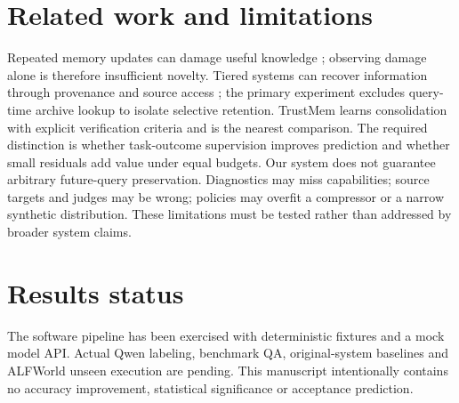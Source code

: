 \documentclass[11pt]{article}
\begin{document}
\section{Related work and limitations}
Repeated memory updates can damage useful knowledge \cite{faulty}; observing
damage alone is therefore insufficient novelty. Tiered systems can recover
information through provenance and source access \cite{tiermem}; the primary
experiment excludes query-time archive lookup to isolate selective retention.
TrustMem learns consolidation with explicit verification criteria \cite{trustmem}
and is the nearest comparison. The required distinction is whether task-outcome
supervision improves prediction and whether small residuals add value under equal
budgets. Our system does not guarantee arbitrary future-query preservation.
Diagnostics may miss capabilities; source targets and judges may be wrong;
policies may overfit a compressor or a narrow synthetic distribution. These
limitations must be tested rather than addressed by broader system claims.

\section{Results status}
The software pipeline has been exercised with deterministic fixtures and a mock
model API. Actual Qwen labeling, benchmark QA, original-system baselines and
ALFWorld unseen execution are pending. This manuscript intentionally contains no
accuracy improvement, statistical significance or acceptance prediction.



\end{document}
